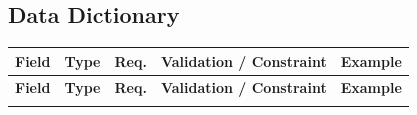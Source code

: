 \documentclass[12pt,a4paper]{article}
\begin{document}
\begin{longtable}{@{}L{2.8cm}L{3.5cm}L{4cm}L{5cm}@{}}
\end{longtable}

\subsection{Data Dictionary}

\begin{longtable}{@{}L{3.2cm}L{2.8cm}C{1.2cm}L{4cm}L{3.5cm}@{}}
  
    \textbf{Field} & \textbf{Type} & \textbf{Req.} & \textbf{Validation / Constraint} & \textbf{Example} \\
  \midrule
  \endfirsthead
  
    \textbf{Field} & \textbf{Type} & \textbf{Req.} & \textbf{Validation / Constraint} & \textbf{Example} \\
  \midrule
  \endhead
  
  \endfoot


\end{longtable}
\end{document}
